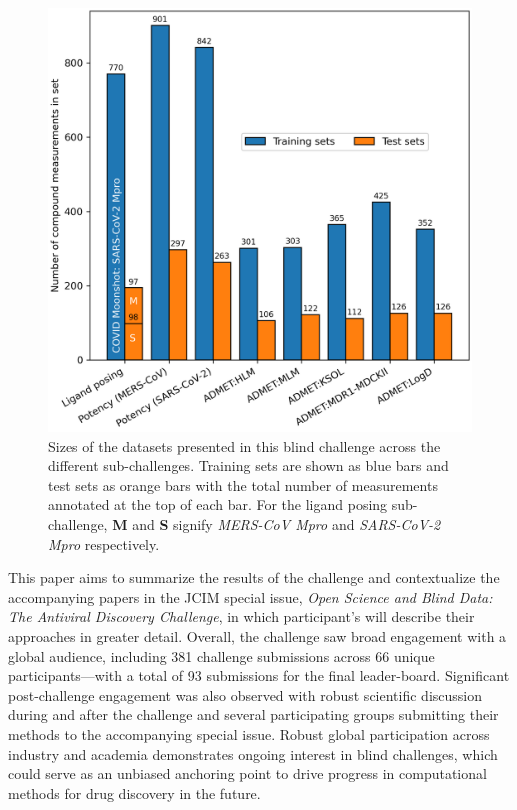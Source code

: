 \documentclass[journal=jcim,manuscript=article]{achemso}
\begin{document}
\begin{figure}
    \includegraphics[scale=0.5]{01_figs_introduction/datasets_overview.png}
  \caption{Sizes of the datasets presented in this blind challenge across the different sub-challenges. Training sets are shown as blue bars and test sets as orange bars with the total number of measurements annotated at the top of each bar. For the ligand posing sub-challenge, \textbf{M} and \textbf{S} signify \textit{MERS-CoV Mpro} and \textit{SARS-CoV-2 Mpro} respectively. }
  \label{fgr:datasets_overview}
\end{figure}



This paper aims to summarize the results of the challenge and contextualize the accompanying papers in the JCIM special issue, \textit{Open Science and Blind Data: The Antiviral Discovery Challenge}, in which participant's will describe their approaches in greater detail. Overall, the challenge saw broad engagement with a global audience, including 381 challenge submissions across 66 unique participants---with a total of 93 submissions for the final leader-board. Significant post-challenge engagement was also observed with robust scientific discussion during and after the challenge and several participating groups submitting their methods to the accompanying special issue. Robust global participation across industry and academia demonstrates ongoing interest in blind challenges, which could serve as an unbiased anchoring point to drive progress in computational methods for drug discovery in the future. 
\end{document}
